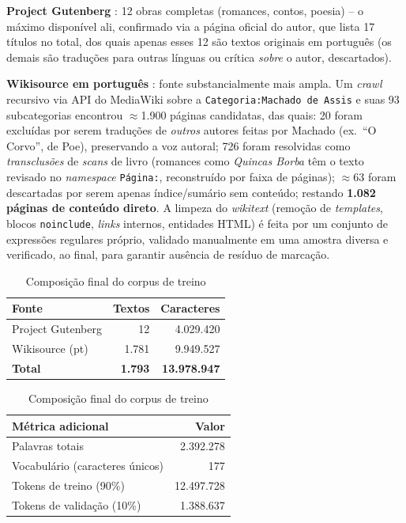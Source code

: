 \documentclass[conference]{IEEEtran}
\begin{document}
\textbf{Project Gutenberg} \cite{gutenberg_machado}: 12 obras completas
(romances, contos, poesia) -- o máximo disponível ali, confirmado via a
página oficial do autor, que lista 17 títulos no total, dos quais apenas
esses 12 são textos originais em português (os demais são traduções para
outras línguas ou crítica \emph{sobre} o autor, descartados).

\textbf{Wikisource em português} \cite{wikisource_machado}: fonte
substancialmente mais ampla. Um \textit{crawl} recursivo via API do
MediaWiki sobre a \texttt{Categoria:Machado de Assis} e suas 93
subcategorias encontrou $\approx$1.900 páginas candidatas, das quais: 20
foram excluídas por serem traduções de \emph{outros} autores feitas por
Machado (ex.\ ``O Corvo'', de Poe), preservando a voz autoral; 726 foram
resolvidas como \textit{transclusões} de \textit{scans} de livro (romances
como \textit{Quincas Borba} têm o texto revisado no \textit{namespace}
\texttt{Página:}, reconstruído por faixa de páginas); $\approx$63 foram
descartadas por serem apenas índice/sumário sem conteúdo; restando
\textbf{1.082 páginas de conteúdo direto}. A limpeza do \textit{wikitext}
(remoção de \textit{templates}, blocos \texttt{noinclude}, \textit{links}
internos, entidades HTML) é feita por um conjunto de expressões regulares
próprio, validado manualmente em uma amostra diversa e verificado, ao final,
para garantir ausência de resíduo de marcação.

\begin{table}[!t]
\centering
\caption{Composição final do corpus de treino}
\label{tab:corpus}
\begin{tabular}{@{}lrr@{}}
\toprule
Fonte & Textos & Caracteres \\
\midrule
Project Gutenberg & 12 & 4.029.420 \\
Wikisource (pt)\footnotemark[1] & 1.781 & 9.949.527 \\
\midrule
\textbf{Total} & \textbf{1.793} & \textbf{13.978.947} \\
\bottomrule
\end{tabular}

\vspace{4pt}
\begin{tabular}{@{}lr@{}}
\toprule
Métrica adicional & Valor \\
\midrule
Palavras totais & 2.392.278 \\
Vocabulário (caracteres únicos) & 177 \\
Tokens de treino (90\%) & 12.497.728 \\
Tokens de validação (10\%) & 1.388.637 \\
\bottomrule
\end{tabular}
\end{table}
\end{document}
